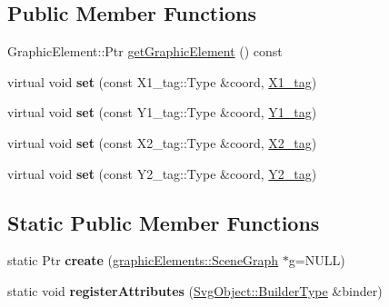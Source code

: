 \subsection*{Public Member Functions}
\begin{DoxyCompactItemize}
\item 
GraphicElement::Ptr \hyperlink{classsambag_1_1disco_1_1svg_1_1_svg_line_a3aaf9f0b25b22387c252b06006414acd}{getGraphicElement} () const 
\item 
\hypertarget{classsambag_1_1disco_1_1svg_1_1_svg_line_aa80f8a324e4671c23df0898783df5489}{
virtual void {\bfseries set} (const X1\_\-tag::Type \&coord, \hyperlink{structsambag_1_1disco_1_1svg_1_1_svg_line_1_1_x1__tag}{X1\_\-tag})}
\label{classsambag_1_1disco_1_1svg_1_1_svg_line_aa80f8a324e4671c23df0898783df5489}

\item 
\hypertarget{classsambag_1_1disco_1_1svg_1_1_svg_line_a87789bfb19736ea53199bd80c458c73f}{
virtual void {\bfseries set} (const Y1\_\-tag::Type \&coord, \hyperlink{structsambag_1_1disco_1_1svg_1_1_svg_line_1_1_y1__tag}{Y1\_\-tag})}
\label{classsambag_1_1disco_1_1svg_1_1_svg_line_a87789bfb19736ea53199bd80c458c73f}

\item 
\hypertarget{classsambag_1_1disco_1_1svg_1_1_svg_line_a91d45febb1f2201003c14442709d132b}{
virtual void {\bfseries set} (const X2\_\-tag::Type \&coord, \hyperlink{structsambag_1_1disco_1_1svg_1_1_svg_line_1_1_x2__tag}{X2\_\-tag})}
\label{classsambag_1_1disco_1_1svg_1_1_svg_line_a91d45febb1f2201003c14442709d132b}

\item 
\hypertarget{classsambag_1_1disco_1_1svg_1_1_svg_line_a934afe5dd89b93a886c2831c6ccb1a9e}{
virtual void {\bfseries set} (const Y2\_\-tag::Type \&coord, \hyperlink{structsambag_1_1disco_1_1svg_1_1_svg_line_1_1_y2__tag}{Y2\_\-tag})}
\label{classsambag_1_1disco_1_1svg_1_1_svg_line_a934afe5dd89b93a886c2831c6ccb1a9e}

\end{DoxyCompactItemize}
\subsection*{Static Public Member Functions}
\begin{DoxyCompactItemize}
\item 
\hypertarget{classsambag_1_1disco_1_1svg_1_1_svg_line_a83a7db324d077424a330fe646445f536}{
static Ptr {\bfseries create} (\hyperlink{classsambag_1_1disco_1_1graphic_elements_1_1_scene_graph}{graphicElements::SceneGraph} $\ast$g=NULL)}
\label{classsambag_1_1disco_1_1svg_1_1_svg_line_a83a7db324d077424a330fe646445f536}

\item 
\hypertarget{classsambag_1_1disco_1_1svg_1_1_svg_line_aa02807989c1f5cc0f5a5d471432d25d3}{
static void {\bfseries registerAttributes} (\hyperlink{classsambag_1_1xml_1_1_x_m_l2_object}{SvgObject::BuilderType} \&binder)}
\label{classsambag_1_1disco_1_1svg_1_1_svg_line_aa02807989c1f5cc0f5a5d471432d25d3}

\end{DoxyCompactItemize}
